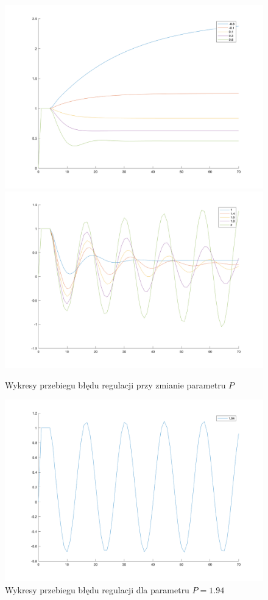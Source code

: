 \documentclass[a4paper,10pt]{article}
\begin{document}
\begin{figure}[!h]
    \centering
	\includegraphics[width=120mm]{p_1.png}
	\includegraphics[width=120mm]{p_2.png}
	\caption{Wykresy przebiegu błędu regulacji przy zmianie parametru $P$}
    \label{fig:symulacjaP}
\end{figure}

\newpage

\begin{figure}[!h]
	\centering
	\includegraphics[width=120mm]{p_3.png}
	\caption{Wykresy przebiegu błędu regulacji dla parametru $P=1.94$}
	\label{fig:symulacjaP194}
\end{figure}
\end{document}
